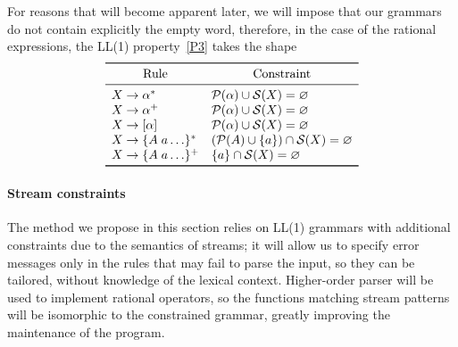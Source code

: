 For reasons that will become apparent later, we will impose that our
grammars do not contain explicitly the empty word, therefore, in the
case of the rational expressions, the LL(1) property~\vref{P3} takes
the shape
\begin{equation*}
\begin{array}{ll}
\toprule
\multicolumn{1}{c}{\text{Rule}} & \multicolumn{1}{c}{\text{Constraint}}\\
\midrule
  X \rightarrow \alpha^*
& \first{\alpha} \cup \follow{X} = \varnothing\\
  X \rightarrow \alpha^+
& \first{\alpha} \cup \follow{X} = \varnothing\\
  X \rightarrow [\alpha]
& \first{\alpha} \cup \follow{X} = \varnothing\\
  X \rightarrow \{A \; a \ldots\}^*
& (\first{A} \cup \{a\}) \cap \follow{X} = \varnothing\\
  X \rightarrow \{A \; a \ldots\}^+
& \{a\} \cap \follow{X} = \varnothing\\
\bottomrule
\end{array}
\end{equation*}

\paragraph{Stream constraints}

The method we propose in this section relies on LL(1) grammars with
additional constraints due to the semantics of streams; it will allow
us to specify error messages only in the rules that may fail to parse
the input, so they can be tailored, without knowledge of the lexical
context. Higher\hyp{}order parser will be used to implement rational
operators, so the functions matching stream patterns will be
isomorphic to the constrained grammar, greatly improving the
maintenance of the program.

